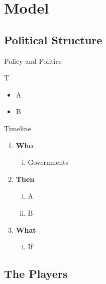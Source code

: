 \documentclass[handout]{beamer}
\newcommand{\ga}{\gamma}
\begin{document}
\section{Model}
\subsection{Political Structure}
\begin{frame}{Policy and Politics}

\pause
T
\pause
\begin{itemize}
	\item A
	\pause
	\item B
\end{itemize}


\end{frame}



\begin{frame}{Timeline}
\pause
\begin{enumerate}[<+->]
	\item {\bfseries Who}
		\begin{enumerate}[i.]
			\item Governments 
		\end{enumerate}
	\item \textbf{Then}
		\begin{enumerate}[i.]
			\item A
			\item B
		\end{enumerate}
	\item \textbf{What}
		\begin{enumerate}[i.]
			\item If
		\end{enumerate}
\end{enumerate}
\end{frame}


\subsection{The Players}

\end{document}

